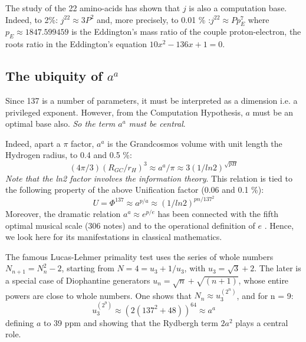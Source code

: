 \documentclass[twoside,draft]{article}
\begin{document}
\begin{sloppypar}
The study of the 22 amino-acids \cite{Sanchez1} has shown that $j$ is also a computation base. Indeed, to 2\%: $j^{22} \approx 3 P^2 $ and, more precisely, to 0.01 \% :$j^{22} \approx Pp_E^7 $ where $ p_E \approx 1847.599459$ is the Eddington's mass ratio of the couple proton-electron, the roots ratio in the Eddington's equation $10x^2 - 136x + 1 = 0 $.



\subsection{The ubiquity of $a^{a}$}

Since 137 is a number of parameters, it must be interpreted as a dimension i.e. a privileged exponent. However, from the Computation Hypothesis, $a$ must be an optimal base also. \textit{So the term $a^a$ must be central}.
    
Indeed, apart a $\pi$ factor, $a^a$ is the Grandcosmos volume with unit length the Hydrogen radius, to 0.4 and 0.5 \%:
\begin{equation}
(4\pi/3)(R_{GC}/r_H)^3 \approx a^a/\pi \approx 3(1/ln2)^{\sqrt{pH}}
\end{equation}
\textit{Note that the ln2 factor involves the information theory}. This relation is tied to the following property of the above Unification factor (0.06 and 0.1 \%):
\begin{equation}
U = \Phi^{137}\approx a^{p/a}\approx (1/ln2)^{pn/137^2}
\end{equation}
Moreover, the dramatic relation $a^a\approx e^{p/e}$ has been connected with the fifth optimal musical scale (306 notes) and to the operational definition of $e$ \cite{Sanchez1}. Hence,  we look here for its manifestations in classical mathematics. 

The famous Lucas-Lehmer primality test uses the series of whole numbers $N_{n+1} = N_{n}^{2}-2$,
starting from $N = 4 = u_{3} + 1/u_{3}$, with $u_{3} = \sqrt{3} + 2$. The later is a special case of Diophantine generators $u_{n} = \sqrt{n} + \sqrt{(n+1)}$, whose entire powers are close to whole numbers. One shows that $N_{n} \approx u_{3}^{(2^{n})}$, and for n = 9:
\begin{equation}
u_{3}^{(2^9)} \approx (2(137^{2} + 48))^{64} \approx a^{a}
\end{equation}
defining $a$ to 39 ppm and showing that the Rydbergh term $2a^2$ plays a central role.


\end{sloppypar}
\end{document}

